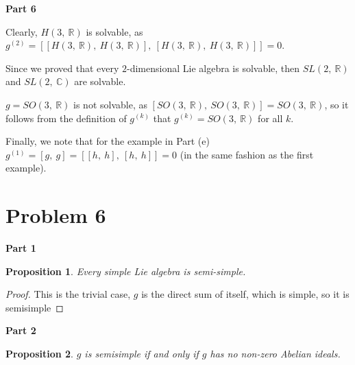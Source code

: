 \documentclass[10pt, oneside]{article}
\newtheorem{prop}{Proposition}
\begin{document}
    \textbf{Part 6}
    \newline

    Clearly, $H(3, \ \mathbb{R})$ is solvable, as $g^{(2)} = [[H(3, \ \mathbb{R}), \ H(3, \ \mathbb{R})], \ [H(3, \ \mathbb{R}), \ H(3, \ \mathbb{R})]] = 0$.
    \newline

    Since we proved that every $2$-dimensional Lie algebra is solvable, then $SL(2, \ \mathbb{R})$ and $SL(2, \ \mathbb{C})$ are solvable.
    \newline

    $g = SO(3, \ \mathbb{R})$ is not solvable, as $[SO(3, \ \mathbb{R}), \ SO(3, \ \mathbb{R})] = SO(3, \ \mathbb{R})$, so it follows from the definition of $g^{(k)}$ that
    $g^{(k)} = SO(3, \ \mathbb{R})$ for all $k$.
    \newline

    Finally, we note that for the example in Part (e) $g^{(1)} = [g, \ g] = [[h, \ h], \ [h, \ h]] = 0$ (in the same fashion as the first example).

    \section{Problem 6}

    \textbf{Part 1}
    \newline

    \begin{prop}
      Every simple Lie algebra is semi-simple.
      \end{prop}

    \begin{proof}
      This is the trivial case, $g$ is the direct sum of itself, which is simple, so it is semisimple
    \end{proof}

    \textbf{Part 2}
    \newline

    \begin{prop}
      $g$ is semisimple if and only if $g$ has no non-zero Abelian ideals.
    \end{prop}
\end{document}
